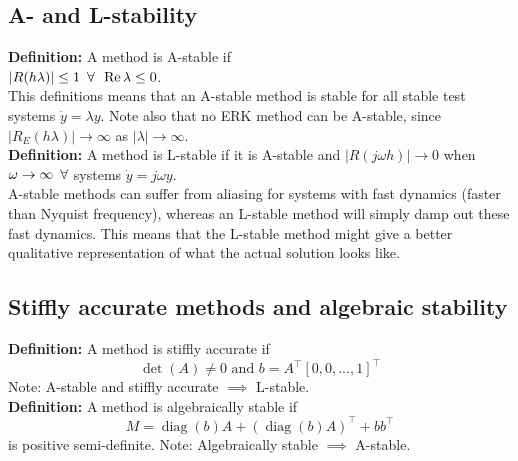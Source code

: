 \subsection{A- and L-stability}
\textbf{Definition:} A method is A-stable if \\ $|R(h\lambda)| \leq 1 \enskip \forall \enskip \operatorname{Re} \lambda \leq 0$.\\
This definitions means that an A-stable method is stable for all stable test systems $\dot{y} = \lambda y$. Note also that no ERK method can be A-stable, since $|R_E(h\lambda)| \to \infty$ as $|\lambda| \to \infty$.\\
\textbf{Definition:} A method is L-stable if it is A-stable and $|R(j\omega h)| \to 0$ when $\omega \to \infty \enskip \forall$ systems $\dot{y} = j\omega y$.\\
A-stable methods can suffer from aliasing for systems with fast dynamics (faster than Nyquist frequency), whereas an L-stable method will simply damp out these fast dynamics. This means that the L-stable method might give a better qualitative representation of what the actual solution looks like.

\subsection{Stiffly accurate methods and algebraic stability}
\textbf{Definition:} A method is stiffly accurate if
\begin{equation}
    \det(A) \neq 0 \text{ and } b = A^\top [0, 0, ..., 1]^\top
\end{equation}
Note: A-stable and stiffly accurate $\implies$ L-stable.\\
\textbf{Definition:} A method is algebraically stable if 
\begin{equation} 
    M = \operatorname{diag}(b)A + (\operatorname{diag}(b)A)^\top + bb^\top
\end{equation}
is positive semi-definite. Note: Algebraically stable $\implies$ A-stable.

